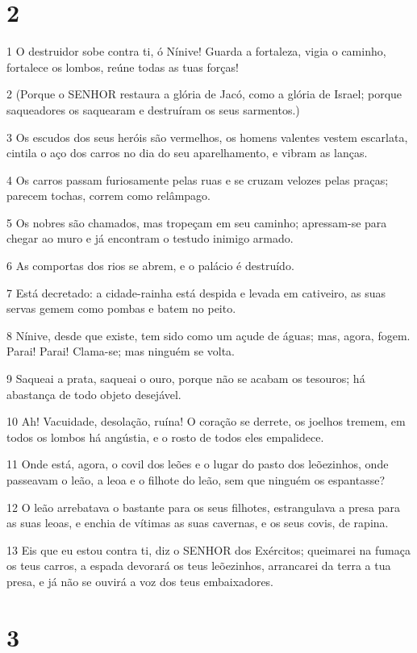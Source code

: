 \chapter{2}

\par 1 O destruidor sobe contra ti, ó Nínive! Guarda a fortaleza, vigia o caminho, fortalece os lombos, reúne todas as tuas forças!
\par 2 (Porque o SENHOR restaura a glória de Jacó, como a glória de Israel; porque saqueadores os saquearam e destruíram os seus sarmentos.)
\par 3 Os escudos dos seus heróis são vermelhos, os homens valentes vestem escarlata, cintila o aço dos carros no dia do seu aparelhamento, e vibram as lanças.
\par 4 Os carros passam furiosamente pelas ruas e se cruzam velozes pelas praças; parecem tochas, correm como relâmpago.
\par 5 Os nobres são chamados, mas tropeçam em seu caminho; apressam-se para chegar ao muro e já encontram o testudo inimigo armado.
\par 6 As comportas dos rios se abrem, e o palácio é destruído.
\par 7 Está decretado: a cidade-rainha está despida e levada em cativeiro, as suas servas gemem como pombas e batem no peito.
\par 8 Nínive, desde que existe, tem sido como um açude de águas; mas, agora, fogem. Parai! Parai! Clama-se; mas ninguém se volta.
\par 9 Saqueai a prata, saqueai o ouro, porque não se acabam os tesouros; há abastança de todo objeto desejável.
\par 10 Ah! Vacuidade, desolação, ruína! O coração se derrete, os joelhos tremem, em todos os lombos há angústia, e o rosto de todos eles empalidece.
\par 11 Onde está, agora, o covil dos leões e o lugar do pasto dos leõezinhos, onde passeavam o leão, a leoa e o filhote do leão, sem que ninguém os espantasse?
\par 12 O leão arrebatava o bastante para os seus filhotes, estrangulava a presa para as suas leoas, e enchia de vítimas as suas cavernas, e os seus covis, de rapina.
\par 13 Eis que eu estou contra ti, diz o SENHOR dos Exércitos; queimarei na fumaça os teus carros, a espada devorará os teus leõezinhos, arrancarei da terra a tua presa, e já não se ouvirá a voz dos teus embaixadores.

\chapter{3}

